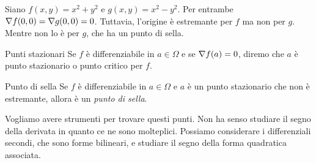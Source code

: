 \documentclass[a4paper]{article}
\begin{document}
\begin{radioactive}
\begin{snippetexample}{}
    Siano \(f(x,y) = x^2 + y^2\) e \(g(x,y) = x^2 - y^2\).
    Per entrambe \(\nabla f(0,0) = \nabla g(0,0) = 0\).
    Tuttavia, l'origine è estremante per \(f\) ma non per \(g\).
    Mentre non lo è per \(g\), che ha un punto di sella.
\end{snippetexample}

\begin{snippetdefinition}{Punti stazionari}
    Se \(f\) è differenziabile in \(a \in \Omega\)
    e se \(\nabla f(a) = 0\), diremo che
    \(a\) è punto stazionario o punto critico per \(f\).
\end{snippetdefinition}

\begin{snippetdefinition}{Punto di sella}
    Se \(f\) è differenziabile in \(a \in \Omega\)
    e \(a\) è un punto stazionario che non è estremante, allora
    è un \emph{punto di sella}.
\end{snippetdefinition}

Vogliamo avere strumenti per trovare questi punti.
Non ha senso studiare il segno della derivata in quanto ce ne sono molteplici.
Possiamo considerare i differenziali secondi,
che sono forme bilineari, e studiare il segno della forma quadratica associata.
\end{radioactive}
\end{document}
